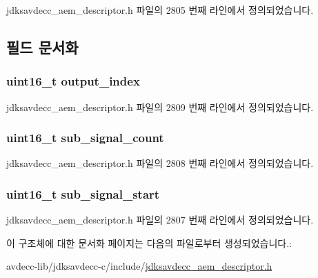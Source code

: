 jdksavdecc\+\_\+aem\+\_\+descriptor.\+h 파일의 2805 번째 라인에서 정의되었습니다.



\subsection{필드 문서화}
\subsubsection[{\texorpdfstring{output\+\_\+index}{output_index}}]{\setlength{\rightskip}{0pt plus 5cm}uint16\+\_\+t output\+\_\+index}\hypertarget{structjdksavdecc__splitter__map_a894cb1dd2c8dab6ee5d8e165370fa0a7}{}\label{structjdksavdecc__splitter__map_a894cb1dd2c8dab6ee5d8e165370fa0a7}


jdksavdecc\+\_\+aem\+\_\+descriptor.\+h 파일의 2809 번째 라인에서 정의되었습니다.

\subsubsection[{\texorpdfstring{sub\+\_\+signal\+\_\+count}{sub_signal_count}}]{\setlength{\rightskip}{0pt plus 5cm}uint16\+\_\+t sub\+\_\+signal\+\_\+count}\hypertarget{structjdksavdecc__splitter__map_a539ba5ac909f01c2b76e345233d20902}{}\label{structjdksavdecc__splitter__map_a539ba5ac909f01c2b76e345233d20902}


jdksavdecc\+\_\+aem\+\_\+descriptor.\+h 파일의 2808 번째 라인에서 정의되었습니다.

\subsubsection[{\texorpdfstring{sub\+\_\+signal\+\_\+start}{sub_signal_start}}]{\setlength{\rightskip}{0pt plus 5cm}uint16\+\_\+t sub\+\_\+signal\+\_\+start}\hypertarget{structjdksavdecc__splitter__map_a4277ab8f00d35ea7381d919a79324a2f}{}\label{structjdksavdecc__splitter__map_a4277ab8f00d35ea7381d919a79324a2f}


jdksavdecc\+\_\+aem\+\_\+descriptor.\+h 파일의 2807 번째 라인에서 정의되었습니다.



이 구조체에 대한 문서화 페이지는 다음의 파일로부터 생성되었습니다.\+:\begin{DoxyCompactItemize}
\item 
avdecc-\/lib/jdksavdecc-\/c/include/\hyperlink{jdksavdecc__aem__descriptor_8h}{jdksavdecc\+\_\+aem\+\_\+descriptor.\+h}\end{DoxyCompactItemize}
